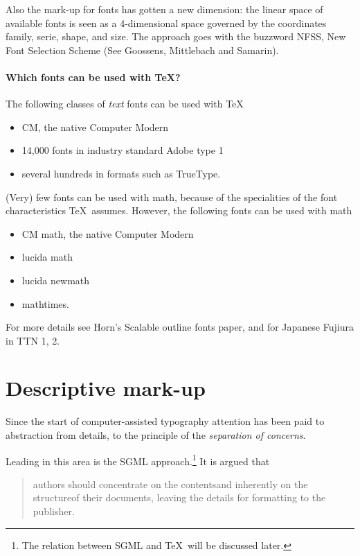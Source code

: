 Also the mark-up for fonts has gotten a new dimension: the linear space of
available fonts is seen as a 4-dimensional space governed by the coordinates
family, serie, shape, and size. The approach goes with the buzzword NFSS,
New Font Selection Scheme (See Goossens, Mittlebach and Samarin).

\paragraph*{Which fonts can be used with \TeX?}
The following classes of {\em text\/} fonts can be used with \TeX
\begin{itemize}
\item CM, the native Computer Modern
\item 14,000 fonts in industry standard Adobe type 1
\item several hundreds in formats such as TrueType.
\end{itemize}
(Very) few fonts can be used with math,
because of the specialities of the
font characteristics \TeX\ assumes.
However, the following fonts can be used with math
\begin{itemize}
\item CM math, the native Computer Modern
\item lucida math
\item lucida newmath
\item mathtimes.
\end{itemize}
For more details see Horn's Scalable outline fonts paper, and for Japanese
Fujiura in TTN 1, 2.

\section{Descriptive mark-up}
Since the start of computer-assisted typography attention has been paid
to abstraction from details, to the principle of the
{\em separation of concerns}.

Leading in this area is the SGML approach.\footnote{The relation
   between SGML and \TeX\ will be discussed later.}
It is argued that
\begin{quote}
authors should concentrate on the contents\Dash and inherently on the
structure\Dash of their documents, leaving the details for formatting
to the publisher.
\end{quote}

